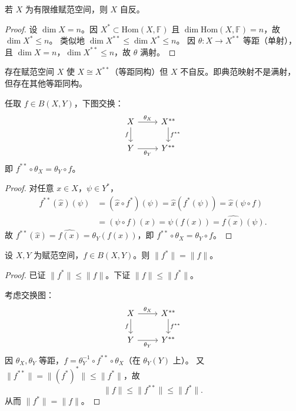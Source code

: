 \documentclass[lang=cn,a4paper,newtx,section]{elegantbook}
\begin{document}
\begin{proposition}
  若 $X$ 为有限维赋范空间，则 $X$ 自反。
\end{proposition}

\begin{proof}
  设 $\dim X=n$。因 $X^*\subset\mathrm{Hom}(X,\mathbb{F})$ 且 $\dim\mathrm{Hom}(X,\mathbb{F})=n$，故 $\dim X^*\le n$。
  类似地 $\dim X^{**}\le\dim X^*\le n$。
  因 $\theta:X\to X^{**}$ 等距（单射），且 $\dim X=n$，$\dim X^{**}\le n$，故 $\theta$ 满射。
\end{proof}

\begin{remark}
  存在赋范空间 $X$ 使 $X\cong X^{**}$（等距同构）但 $X$ 不自反。即典范映射不是满射，但存在其他等距同构。
\end{remark}

\begin{proposition}
  任取 $f\in B(X,Y)$，下图交换：
  \[
    \begin{tikzcd}
      X \arrow[r,"\theta_X"] \arrow[d,"f"'] & X^{**} \arrow[d,"f^{**}"] \\
      Y \arrow[r,"\theta_Y"'] & Y^{**}
    \end{tikzcd}
  \]
  即 $f^{**}\circ\theta_X=\theta_Y\circ f$。
\end{proposition}

\begin{proof}
  对任意 $x\in X$，$\psi\in Y^*$，
  \begin{align*}
    f^{**}(\hat{x})(\psi)&=(\hat{x}\circ f^*)(\psi)=\hat{x}(f^*(\psi))=\hat{x}(\psi\circ f)\\
    &=(\psi\circ f)(x)=\psi(f(x))=\widehat{f(x)}(\psi).
  \end{align*}
  故 $f^{**}(\hat{x})=\widehat{f(x)}=\theta_Y(f(x))$，即 $f^{**}\circ\theta_X=\theta_Y\circ f$。
\end{proof}

\begin{theorem}
  设 $X,Y$ 为赋范空间，$f\in B(X,Y)$。则 $\|f^*\|=\|f\|$。
\end{theorem}

\begin{proof}
  已证 $\|f^*\|\le\|f\|$。下证 $\|f\|\le\|f^*\|$。

  考虑交换图：
  \[
    \begin{tikzcd}
      X \arrow[r,"\theta_X"] \arrow[d,"f"'] & X^{**} \arrow[d,"f^{**}"] \\
      Y \arrow[r,"\theta_Y"'] & Y^{**}
    \end{tikzcd}
  \]
  因 $\theta_X,\theta_Y$ 等距，$f=\theta_Y^{-1}\circ f^{**}\circ\theta_X$（在 $\theta_Y(Y)$ 上）。
  又 $\|f^{**}\|=\|(f^*)^*\|\le\|f^*\|$，故
  \[
    \|f\|\le\|f^{**}\|\le\|f^*\|.
  \]
  从而 $\|f^*\|=\|f\|$。
\end{proof}
\end{document}
